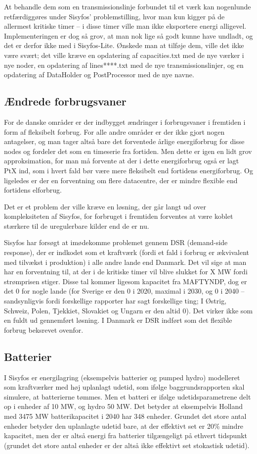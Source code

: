 \documentclass{article}
\begin{document}
At behandle dem som en transmissionslinje forbundet til et værk kan nogenlunde retfærdiggøres under Sisyfos' problemstilling, hvor man kun kigger på de allermest kritiske timer -- i disse timer ville man ikke eksportere energi alligevel. Implementeringen er dog så grov, at man nok lige så godt kunne have undladt, og det er derfor ikke med i Sisyfos-Lite. Ønskede man at tilføje dem, ville det ikke være svært; det ville kræve en opdatering af capacities.txt med de nye værker i nye noder, en opdatering af lines****.txt med de nye transmissionslinjer, og en opdatering af DataHolder og PostProcessor med de nye navne. 
\subsection{Ændrede forbrugsvaner}
For de danske områder er der indbygget ændringer i forbrugsvaner i fremtiden i form af fleksibelt forbrug. For alle andre områder er der ikke gjort nogen antagelser, og man tager altså bare det forventede årlige energiforbrug for disse nodes og fordeler det som en timeserie fra fortiden. Men dette er igen en lidt grov approksimation, for man må forvente at der i dette energiforbrug også er lagt PtX ind, som i hvert fald bør være mere fleksibelt end fortidens energiforbrug. Og ligeledes er der en forventning om flere datacentre, der er mindre flexible end fortidens elforbrug. 

Det er et problem der ville kræve en løsning, der går langt ud over kompleksiteten af Sisyfos, for forbruget i fremtiden forventes at være koblet stærkere til de uregulerbare kilder end de er nu.

Sisyfos har forsøgt at imødekomme problemet gennem DSR (demand-side response), der er indkodet som et kraftværk (fordi et fald i forbrug er ækvivalent med tilvækst i produktion) i alle andre lande end Danmark. Det vil sige at man har en forventning til, at der i de kritiske timer vil blive slukket for X MW fordi strømprisen stiger. Disse tal kommer ligesom kapacitet fra MAFTYNDP, dog er det 0 for nogle lande (for Sverige er den 0 i 2020, maximal i 2030, og 0 i 2040 -- sandsynligvis fordi forskellige rapporter har sagt forskellige ting; I Østrig, Schweiz, Polen, Tjekkiet, Slovakiet og Ungarn er den altid 0). Det virker ikke som en fuldt ud gennemført løsning. I Danmark er DSR indført som det flexible forbrug beksrevet ovenfor. 
\subsection{Batterier}
I Sisyfos er energilagring (eksempelvis batterier og pumped hydro) modelleret som kraftværker med høj uplanlagt udetid, som ifølge baggrundsrapporten skal simulere, at batterierne tømmes. Men et batteri er ifølge udetidsparametrene delt op i enheder af 10 MW, og hydro 50 MW. Det betyder at eksempelvis Holland med 3475 MW batterikapacitet i 2040 har 348 enheder. Grundet det store antal enheder betyder den uplanlagte udetid bare, at der effektivt set er 20\% mindre kapacitet, men der er altså energi fra batterier tilgængeligt på ethvert tidspunkt (grundet det store antal enheder er der altså ikke effektivt set stokastisk udetid). 
\end{document}
